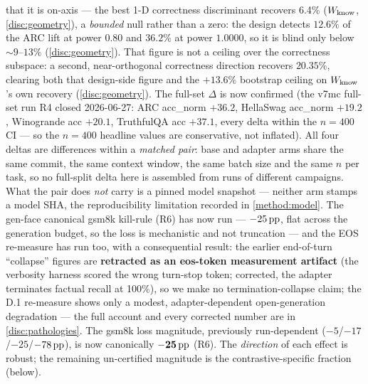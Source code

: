 that it is on-axis --- the best 1-D correctness discriminant recovers 6.4\%
($W_{\mathrm{know}}$, \cref{disc:geometry}), a \emph{bounded} null rather than a zero: the
design detects $12.6\%$ of the ARC lift at power $0.80$ and $36.2\%$ at power
$1.0000$, so it is blind only below ${\sim}9$--$13\%$ (\cref{disc:geometry}). That
figure is not a ceiling over the correctness subspace: a second, near-orthogonal
correctness direction recovers $20.35\%$, clearing both that design-side figure and
the $+13.6\%$ bootstrap ceiling on $W_{\mathrm{know}}$'s own recovery (\cref{disc:geometry}). The full-set $\Delta$ is now confirmed (the v7mc full-set
run R4 closed 2026-06-27: ARC acc\_norm $+36.2$, HellaSwag acc\_norm $+19.2$,
Winogrande acc $+20.1$, TruthfulQA acc $+37.1$, every delta within the $n{=}400$ CI
--- so the $n{=}400$ headline values are conservative, not inflated). All four
deltas are differences within a \emph{matched pair}: base and adapter arms share the
same commit, the same context window, the same batch size and the same $n$ per task,
so no full-split delta here is assembled from runs of different campaigns. What the
pair does \emph{not} carry is a pinned model snapshot --- neither arm stamps a model
SHA, the reproducibility limitation recorded in \cref{method:model}. The gen-face
canonical gsm8k kill-rule (R6) has now run --- $-25\,\mathrm{pp}$, flat across the generation
budget, so the loss is mechanistic and not truncation --- and the EOS re-measure
has run too, with a consequential result: the earlier end-of-turn ``collapse''
figures are \textbf{retracted as an eos-token measurement artifact} (the verbosity
harness scored the wrong turn-stop token; corrected, the adapter terminates factual
recall at 100\%), so we make no termination-collapse claim; the D.1 re-measure
shows only a modest, adapter-dependent open-generation degradation --- the full
account and every corrected number are in \cref{disc:pathologies}. The gsm8k loss
magnitude, previously run-dependent ($-5$/$-17$/$-25$/$-78\,\mathrm{pp}$), is now canonically
$\mathbf{-25\,\mathrm{pp}}$ (R6). The \emph{direction} of each effect is robust; the
remaining un-certified magnitude is the contrastive-specific fraction (below).


